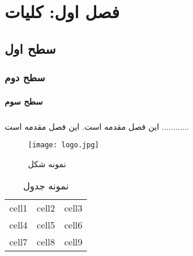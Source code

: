 
\chapter[فصل اول: کلیات]{\centering فصل اول: کلیات} \label{chapter:introduction}
\section{سطح اول} 
\subsection{سطح دوم}
\subsubsection{سطح سوم}
\paragraph*{}
این فصل مقدمه است.  این فصل مقدمه است ............
 \begin{figure}[h!]
  \texttt{[image: logo.jpg]}
  \caption{نمونه شکل}
  \label{fig:logo1}
\end{figure}

\begin{table}
\caption{نمونه جدول}
\label{table:table1}
\begin{tabular}{ |c|c|c| } 
 \hline
 cell1 & cell2 & cell3 \\ 
 cell4 & cell5 & cell6 \\ 
 cell7 & cell8 & cell9 \\ 
 \hline
\end{tabular}
\end{table}